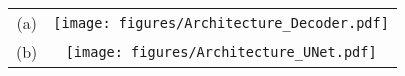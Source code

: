 \documentclass{article}
\begin{document}
\begin{table*}[!ht]
  \begin{center}
  \centering
  \begin{tabular}{ cc }
(a) &
    \begin{minipage}{\linewidth}
      \texttt{[image: figures/Architecture\_Decoder.pdf]}
    \end{minipage} \\

    \rule{0pt}{4ex}  (b) &
    \begin{minipage}{\linewidth}
      \texttt{[image: figures/Architecture\_UNet.pdf]}
    \end{minipage}
    
  \end{tabular}
  \end{center}
\label{fig:structure}
\end{table*}
\end{document}
